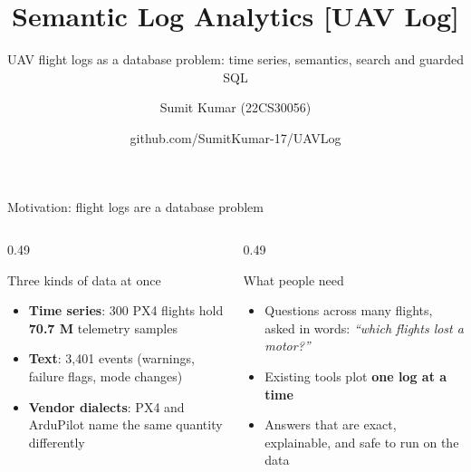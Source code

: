 \documentclass[aspectratio=169,10pt]{beamer}
\title{Semantic Log Analytics [UAV Log]}
\subtitle{UAV flight logs as a database problem: time series, semantics, search and guarded SQL}
\author{Sumit Kumar (22CS30056)}
\institute{Advanced Database Management Systems (CS60113), term project}
\date{\footnotesize github.com/SumitKumar-17/UAVLog}
\begin{document}
\begin{frame}[plain]\titlepage\end{frame}

\begin{frame}[shrink=5]{Motivation: flight logs are a database problem}
\begin{columns}[T]
\begin{column}{0.49\textwidth}
\begin{block}{Three kinds of data at once}
\begin{itemize}
  \item \textbf{Time series}: 300 PX4 flights hold \textbf{70.7 M} telemetry samples
  \item \textbf{Text}: 3,401 events (warnings, failure flags, mode changes)
  \item \textbf{Vendor dialects}: PX4 and ArduPilot name the same quantity differently
\end{itemize}
\end{block}
\end{column}
\begin{column}{0.49\textwidth}
\begin{block}{What people need}
\begin{itemize}
  \item Questions across many flights, asked in words: \emph{``which flights lost a motor?''}
  \item Existing tools plot \textbf{one log at a time}
  \item Answers that are exact, explainable, and safe to run on the data
\end{itemize}
\end{block}
\end{column}
\end{columns}
\end{frame}
\end{document}
